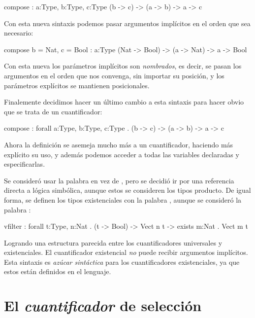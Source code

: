 \begin{designfr}
\begin{anglercode}
compose : { a:Type, b:Type, c:Type } (b -> c) -> (a -> b) -> a -> c
\end{anglercode}

Con esta nueva sintaxis podemos pasar argumentos implícitos en el orden que sea necesario:

\begin{anglercode}
compose { b = Nat, c = Bool } : { a:Type } (Nat -> Bool) -> (a -> Nat) -> a -> Bool
\end{anglercode}

Con esta nueva los parámetros implícitos son \emph{nombrados}, es decir, se pasan los argumentos en el orden que nos convenga, sin importar su posición, y los parámetros explícitos se mantienen posicionales.

Finalemente decidimos hacer un último cambio a esta sintaxis para hacer obvio que se trata de un cuantificador:

\begin{anglercode}
compose : forall a:Type, b:Type, c:Type . (b -> c) -> (a -> b) -> a -> c
\end{anglercode}

Ahora la definición se asemeja mucho más a un cuantificador, haciendo más explícito su uso, y además podemos acceder a todas las variables declaradas y especificarlas.

Se consideró usar la palabra  en vez de , pero se decidió ir por una referencia directa a lógica simbólica, aunque estos se consideren los tipos producto. De igual forma, se definen los tipos existenciales con la palabra , aunque se consideró la palabra :

\begin{anglercode}
vfilter : forall t:Type, n:Nat . (t -> Bool) -> Vect n t -> exists m:Nat . Vect m t
\end{anglercode}

Logrando una estructura parecida entre los cuantificadores universales y existenciales. El cuantificador existencial \emph{no} puede recibir argumentos implícitos. Esta sintaxis es \emph{azúcar sintáctica} para los cuantificadores existenciales, ya que estos están definidos en el lenguaje.
\end{designfr}

\section{El \emph{cuantificador} de selección}

